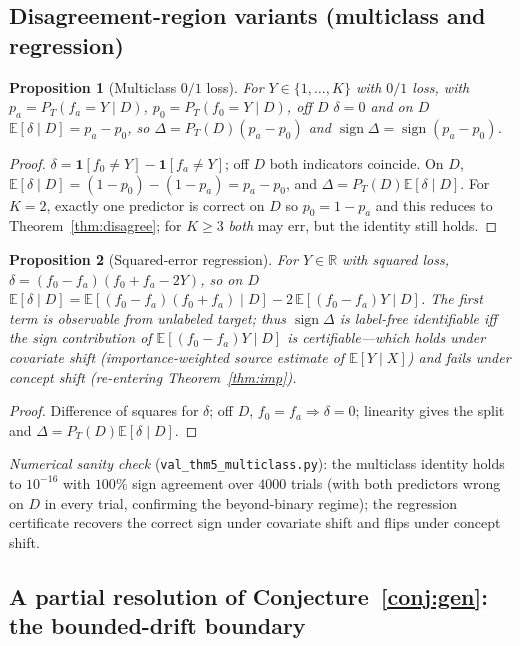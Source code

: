 \documentclass[conference]{IEEEtran}
\theoremstyle{plain}
\newtheorem{proposition}{Proposition}
\theoremstyle{definition}
\newcommand{\R}{\mathbb{R}}
\newcommand{\E}{\mathbb{E}}
\newcommand{\sign}{\operatorname{sign}}
\begin{document}
\subsection{Disagreement-region variants (multiclass and regression)}
\begin{proposition}[Multiclass $0/1$ loss]\label{thm:disagree-mc}
For $Y\in\{1,\dots,K\}$ with $0/1$ loss, with $p_a=P_T(f_a{=}Y\mid D)$,
$p_0=P_T(f_0{=}Y\mid D)$, off $D$ $\delta=0$ and on $D$ $\E[\delta\mid D]=p_a-p_0$, so
$\Delta=P_T(D)(p_a-p_0)$ and $\sign\Delta=\sign(p_a-p_0)$.
\end{proposition}
\begin{proof}
$\delta=\mathbf1[f_0\neq Y]-\mathbf1[f_a\neq Y]$; off $D$ both indicators coincide.
On $D$, $\E[\delta\mid D]=(1-p_0)-(1-p_a)=p_a-p_0$, and $\Delta=P_T(D)\E[\delta\mid D]$.
For $K=2$, exactly one predictor is correct on $D$ so $p_0=1-p_a$ and this reduces to
Theorem~\ref{thm:disagree}; for $K\ge3$ \emph{both} may err, but the identity still holds. \qedhere
\end{proof}
\begin{proposition}[Squared-error regression]\label{thm:disagree-reg}
For $Y\in\R$ with squared loss, $\delta=(f_0-f_a)(f_0+f_a-2Y)$, so on $D$
$\E[\delta\mid D]=\E[(f_0-f_a)(f_0+f_a)\mid D]-2\,\E[(f_0-f_a)Y\mid D]$. The first term is
observable from unlabeled target; thus $\sign\Delta$ is label-free identifiable iff the
sign contribution of $\E[(f_0-f_a)Y\mid D]$ is certifiable---which holds under covariate
shift (importance-weighted source estimate of $\E[Y\mid X]$) and fails under concept
shift (re-entering Theorem~\ref{thm:imp}).
\end{proposition}
\begin{proof}
Difference of squares for $\delta$; off $D$, $f_0=f_a\Rightarrow\delta=0$; linearity gives
the split and $\Delta=P_T(D)\E[\delta\mid D]$. \qedhere
\end{proof}
\noindent\emph{Numerical sanity check} (\texttt{val\_thm5\_multiclass.py}): the multiclass
identity holds to $10^{-16}$ with $100\%$ sign agreement over $4000$ trials (with both
predictors wrong on $D$ in every trial, confirming the beyond-binary regime); the
regression certificate recovers the correct sign under covariate shift and flips under
concept shift.



\subsection{A partial resolution of Conjecture~\ref{conj:gen}: the bounded-drift boundary}\label{sec:regslice}


\end{document}

